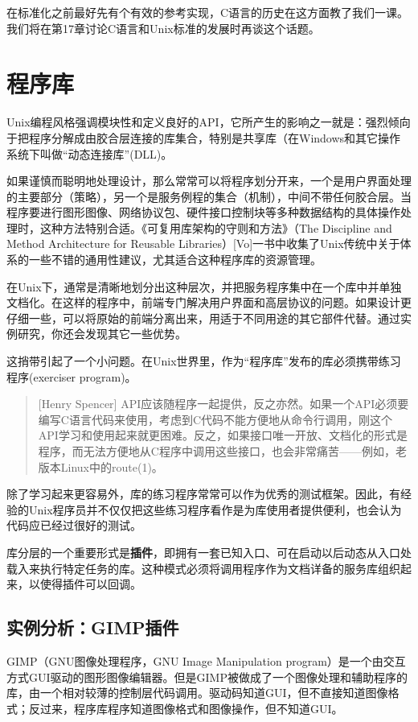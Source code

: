 \documentclass[11pt,oneside]{book}
\begin{document}
\begin{common-format}
在标准化之前最好先有个有效的参考实现，C语言的历史在这方面教了我们一课。我们将在第17章讨论C语言和Unix标准的发展时再谈这个话题。


\section{程序库}
Unix编程风格强调模块性和定义良好的API，它所产生的影响之一就是：强烈倾向于把程序分解成由胶合层连接的库集合，特别是共享库（在Windows和其它操作系统下叫做“动态连接库”(DLL)。

如果谨慎而聪明地处理设计，那么常常可以将程序划分开来，一个是用户界面处理的主要部分（策略），另一个是服务例程的集合（机制），中间不带任何胶合层。当程序要进行图形图像、网络协议包、硬件接口控制块等多种数据结构的具体操作处理时，这种方法特别合适。《可复用库架构的守则和方法》（The Discipline and Method Architecture for Reusable Libraries）[Vo]一书中收集了Unix传统中关于体系的一些不错的通用性建议，尤其适合这种程序库的资源管理。

在Unix下，通常是清晰地划分出这种层次，并把服务程序集中在一个库中并单独文档化。在这样的程序中，前端专门解决用户界面和高层协议的问题。如果设计更仔细一些，可以将原始的前端分离出来，用适于不同用途的其它部件代替。通过实例研究，你还会发现其它一些优势。

这捎带引起了一个小问题。在Unix世界里，作为“程序库”发布的库必须携带练习程序(exerciser program)。

\begin{quote}[Henry Spencer]
API应该随程序一起提供，反之亦然。如果一个API必须要编写C语言代码来使用，考虑到C代码不能方便地从命令行调用，刚这个API学习和使用起来就更困难。反之，如果接口唯一开放、文档化的形式是程序，而无法方便地从C程序中调用这些接口，也会非常痛苦——例如，老版本Linux中的route(1)。
\end{quote}

除了学习起来更容易外，库的练习程序常常可以作为优秀的测试框架。因此，有经验的Unix程序员并不仅仅把这些练习程序看作是为库使用者提供便利，也会认为代码应已经过很好的测试。

库分层的一个重要形式是\textbf{插件}，即拥有一套已知入口、可在启动以后动态从入口处载入来执行特定任务的库。这种模式必须将调用程序作为文档详备的服务库组织起来，以使得插件可以回调。


\subsection{实例分析：GIMP插件}
GIMP（GNU图像处理程序，GNU Image Manipulation program）是一个由交互方式GUI驱动的图形图像编辑器。但是GIMP被做成了一个图像处理和辅助程序的库，由一个相对较薄的控制层代码调用。驱动码知道GUI，但不直接知道图像格式；反过来，程序库程序知道图像格式和图像操作，但不知道GUI。


\end{common-format}
\end{document}

